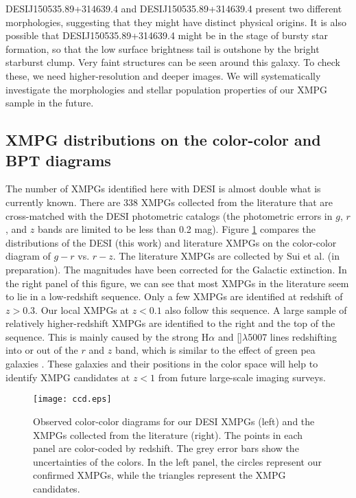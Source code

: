 \documentclass[twocolumn]{aastex631}
\newcommand{\Ha}{\mbox{H$\alpha$}}      %
\newcommand{\OIIIFIZ}{[\mbox{\ion{O}{3}}]$\lambda$5007}
\newcommand{\boldtext}[1]{\textcolor[rgb]{0,0,0}{#1}}
\begin{document}
DESIJ150535.89+314639.4 and DESIJ150535.89+314639.4 present two different morphologies, suggesting that they might have distinct physical origins. It is also possible that DESIJ150535.89+314639.4 might be in the stage of bursty star formation, so that the low surface brightness tail is outshone by the bright starburst clump. \boldtext{Very faint structures can be seen around this galaxy. To check these, we need higher-resolution and deeper images.} We will systematically investigate the morphologies and stellar population properties of our XMPG sample in the future.

\subsection{XMPG distributions on the color-color and BPT diagrams}
The number of XMPGs identified here with DESI is almost double what is currently known. There are 338 XMPGs collected from the literature that are cross-matched with the DESI photometric catalogs (the photometric errors in $g$, $r$, and $z$ bands are limited to be less than 0.2 mag).  Figure \ref{fig:ccd} compares the distributions of the DESI (this work) and literature XMPGs on the color-color diagram of $g-r$ vs. $r-z$. \boldtext{The literature XMPGs are collected by Sui et al. (in preparation).} The magnitudes have been corrected for the Galactic extinction. In the right panel of this figure, we can see that most XMPGs in the literature seem to lie in a low-redshift sequence. Only a few XMPGs are identified at redshift of $z>0.3$. Our local XMPGs at $z<0.1$ also follow this sequence. A large sample of relatively higher-redshift XMPGs are identified to the right and the top of the sequence. This is mainly caused by the strong {\Ha} and {\OIIIFIZ} lines redshifting into or out of the $r$ and $z$ band, \boldtext{which is similar to the effect of green pea galaxies \citep{Car09}.} These galaxies and their positions in the color space will help to identify XMPG candidates at $z<1$ from future large-scale imaging surveys.

\begin{figure}[tbh!]
\texttt{[image: ccd.eps]}
\caption{\boldtext{Observed color-color diagrams} for our DESI XMPGs (left) and the XMPGs collected from the literature (right). The points in each panel are color-coded by redshift. The grey error bars show the uncertainties of the colors. In the left panel, the circles represent our confirmed XMPGs, while the triangles represent the XMPG candidates. \label{fig:ccd}}
\end{figure}
\end{document}
